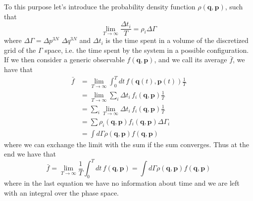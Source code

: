 To this purpose let's introduce the probability density function $\rho(\textbf{q},\textbf{p})$, such that 
\begin{equation}\lim_{T\to\infty}\frac{\Delta t_i}{T} = \rho_i \Delta\Gamma 
\end{equation} where $\Delta\Gamma = \Delta p^{3N}$ $\Delta q^{3N}$ and $\Delta t_i$ is the time spent in a volume of the discretized grid of the $\Gamma$ space, i.e. the time spent by the system in a possible configuration. If we then consider a generic observable $f(\textbf{q},\textbf{p})$, and we call its average $\bar{f}$, we have that
\begin{align}
\bar{f} &= \lim_{T\to\infty}\int_0^T dt\,f(\textbf{q}(t),\textbf{p}(t))\frac{1}{T}\\
&=\lim_{T\to\infty}\sum_i \Delta t_i\,f_i(\textbf{q},\textbf{p})\frac{1}{T}\\
&=\sum_i\lim_{T\to\infty}\Delta t_i\,f_i(\textbf{q},\textbf{p})\frac{1}{T}\\
&=\sum\rho_i(\textbf{q},\textbf{p})f_i(\textbf{q},\textbf{p})\Delta\Gamma_i\\
&=\int d\Gamma\rho(\textbf{q},\textbf{p})f(\textbf{q},\textbf{p})
\end{align}
where we can exchange the limit with the sum if the sum converges. Thus at the end we have that
\begin{equation}
\bar{f} = \lim_{T\to\infty}\frac{1}{T}\int_0^T dt\,f(\textbf{q},\textbf{p}) = \int d\Gamma \rho(\textbf{q},\textbf{p})f(\textbf{q},\textbf{p})
\end{equation}
where in the last equation we have no information about time and we are left with an integral over the phase space.

